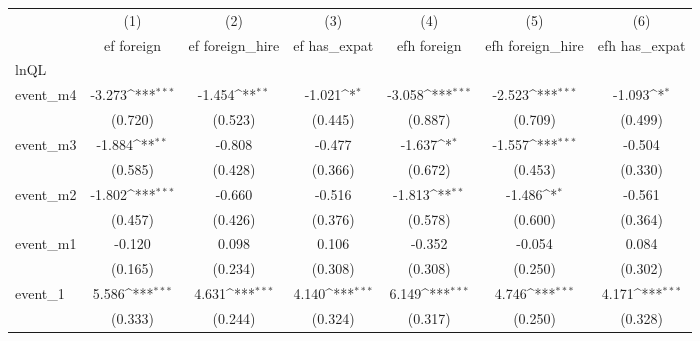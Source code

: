 {
\def\sym#1{\ifmmode^{#1}\else\(^{#1}\)\fi}
\begin{tabular}{l*{6}{c}}
\hline\hline
            &\multicolumn{1}{c}{(1)}&\multicolumn{1}{c}{(2)}&\multicolumn{1}{c}{(3)}&\multicolumn{1}{c}{(4)}&\multicolumn{1}{c}{(5)}&\multicolumn{1}{c}{(6)}\\
            &\multicolumn{1}{c}{ef foreign}&\multicolumn{1}{c}{ef foreign\_hire}&\multicolumn{1}{c}{ef has\_expat}&\multicolumn{1}{c}{efh foreign}&\multicolumn{1}{c}{efh foreign\_hire}&\multicolumn{1}{c}{efh has\_expat}\\
\hline
lnQL        &                     &                     &                     &                     &                     &                     \\
event\_m4    &      -3.273\sym{***}&      -1.454\sym{**} &      -1.021\sym{*}  &      -3.058\sym{***}&      -2.523\sym{***}&      -1.093\sym{*}  \\
            &     (0.720)         &     (0.523)         &     (0.445)         &     (0.887)         &     (0.709)         &     (0.499)         \\
[1em]
event\_m3    &      -1.884\sym{**} &      -0.808         &      -0.477         &      -1.637\sym{*}  &      -1.557\sym{***}&      -0.504         \\
            &     (0.585)         &     (0.428)         &     (0.366)         &     (0.672)         &     (0.453)         &     (0.330)         \\
[1em]
event\_m2    &      -1.802\sym{***}&      -0.660         &      -0.516         &      -1.813\sym{**} &      -1.486\sym{*}  &      -0.561         \\
            &     (0.457)         &     (0.426)         &     (0.376)         &     (0.578)         &     (0.600)         &     (0.364)         \\
[1em]
event\_m1    &      -0.120         &       0.098         &       0.106         &      -0.352         &      -0.054         &       0.084         \\
            &     (0.165)         &     (0.234)         &     (0.308)         &     (0.308)         &     (0.250)         &     (0.302)         \\
[1em]
event\_1     &       5.586\sym{***}&       4.631\sym{***}&       4.140\sym{***}&       6.149\sym{***}&       4.746\sym{***}&       4.171\sym{***}\\
            &     (0.333)         &     (0.244)         &     (0.324)         &     (0.317)         &     (0.250)         &     (0.328)         \\

\end{tabular}}
